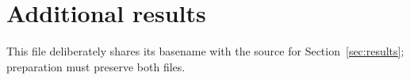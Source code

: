 \section{Additional results}
This file deliberately shares its basename with the source for
Section~\ref{sec:results}; preparation must preserve both files.

